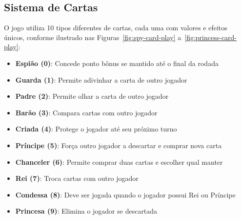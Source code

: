 \subsection{Sistema de Cartas}
O jogo utiliza 10 tipos diferentes de cartas, cada uma com valores e efeitos únicos, conforme ilustrado nas Figuras~\ref{fig:spy-card-play} a~\ref{fig:princess-card-play}:

\begin{itemize}
    \item \textbf{Espião (0)}: Concede ponto bônus se mantido até o final da rodada
    \item \textbf{Guarda (1)}: Permite adivinhar a carta de outro jogador
    \item \textbf{Padre (2)}: Permite olhar a carta de outro jogador
    \item \textbf{Barão (3)}: Compara cartas com outro jogador
    \item \textbf{Criada (4)}: Protege o jogador até seu próximo turno
    \item \textbf{Príncipe (5)}: Força outro jogador a descartar e comprar nova carta
    \item \textbf{Chanceler (6)}: Permite comprar duas cartas e escolher qual manter
    \item \textbf{Rei (7)}: Troca cartas com outro jogador
    \item \textbf{Condessa (8)}: Deve ser jogada quando o jogador possui Rei ou Príncipe
    \item \textbf{Princesa (9)}: Elimina o jogador se descartada
\end{itemize}

